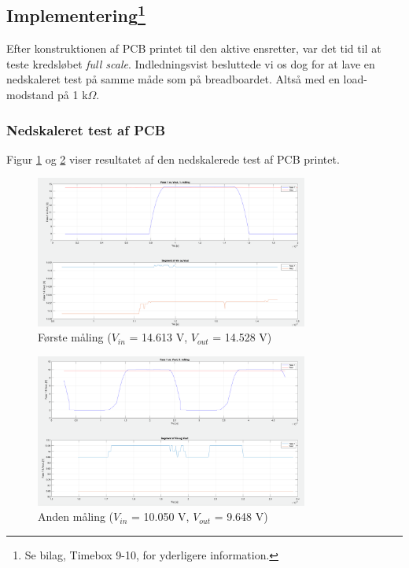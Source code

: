\subsection[Implementering]{Implementering\footnote{Se bilag, Timebox 9-10, for yderligere information.}}
\label{sec:result-bilag-timeb}

Efter konstruktionen af PCB printet til den aktive ensretter, var det tid til at teste kredsløbet \textit{full scale}. Indledningsvist besluttede vi os dog for at lave en nedskaleret test på samme måde som på breadboardet. Altså med en load-modstand på 1 k$\Omega$.

\subsubsection{Nedskaleret test af PCB}
\label{sec:nedskaleret-test-af}

Figur \ref{fig:nt5} og \ref{fig:nt6} viser resultatet af den nedskalerede test af PCB printet.
\clearpage
\begin{figure}[h]
  \centering
  \includegraphics[width=0.8\textwidth]{./figurer/nt5.png}
  \caption{Første måling ($V_{in}$ = 14.613 V, $V_{out}$ = 14.528 V)}
  \label{fig:nt5}
\end{figure}

\begin{figure}[h]
  \centering
  \includegraphics[width=0.8\textwidth]{./figurer/nt6.png}
  \caption{Anden måling ($V_{in}$ = 10.050 V, $V_{out}$ = 9.648 V)}
  \label{fig:nt6}
\end{figure}

